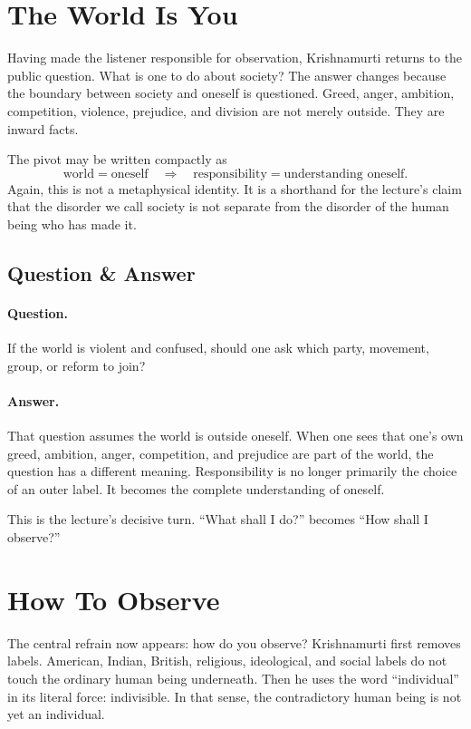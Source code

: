 \section{The World Is You}

Having made the listener responsible for observation, Krishnamurti returns to the public question. What is one to do about society? The answer changes because the boundary between society and oneself is questioned. Greed, anger, ambition, competition, violence, prejudice, and division are not merely outside. They are inward facts.

The pivot may be written compactly as
\begin{equation}
\text{world} = \text{oneself}
\quad\Longrightarrow\quad
\text{responsibility} = \text{understanding oneself}.
\end{equation}
Again, this is not a metaphysical identity. It is a shorthand for the lecture's claim that the disorder we call society is not separate from the disorder of the human being who has made it.

\subsection{Question \& Answer}

\paragraph{Question.}
If the world is violent and confused, should one ask which party, movement, group, or reform to join?

\paragraph{Answer.}
That question assumes the world is outside oneself. When one sees that one's own greed, ambition, anger, competition, and prejudice are part of the world, the question has a different meaning. Responsibility is no longer primarily the choice of an outer label. It becomes the complete understanding of oneself.

This is the lecture's decisive turn. ``What shall I do?'' becomes ``How shall I observe?''

\section{How To Observe}

The central refrain now appears: how do you observe? Krishnamurti first removes labels. American, Indian, British, religious, ideological, and social labels do not touch the ordinary human being underneath. Then he uses the word ``individual'' in its literal force: indivisible. In that sense, the contradictory human being is not yet an individual.

